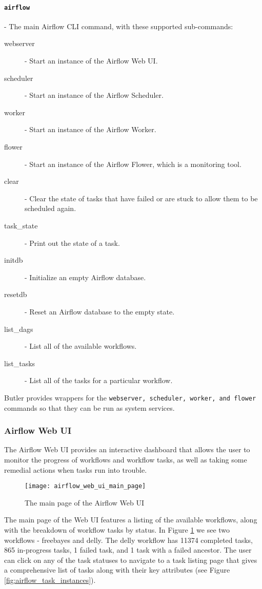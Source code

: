 \paragraph{\texttt{airflow}} - The main Airflow CLI command, with these supported sub-commands:

\begin{description}
\item [webserver] - Start an instance of the Airflow Web UI.
\item [scheduler] - Start an instance of the Airflow Scheduler.
\item [worker] - Start an instance of the Airflow Worker.
\item [flower] - Start an instance of the Airflow Flower, which is a monitoring tool.
\item [clear] - Clear the state of tasks that have failed or are stuck to allow them to be scheduled again.
\item [task\_state] - Print out the state of a task.
\item [initdb] - Initialize an empty Airflow database.
\item [resetdb] - Reset an Airflow database to the empty state.
\item [list\_dags] - List all of the available workflows.
\item [list\_tasks] - List all of the tasks for a particular workflow.
\end{description}

Butler provides wrappers for the \texttt{webserver, scheduler, worker, and flower} commands so that they can be run as system services.

\subsubsection{Airflow Web UI}

The Airflow Web UI provides an interactive dashboard that allows the user to monitor the progress of workflows and workflow tasks, as well as taking some remedial actions when tasks run into trouble.

\begin{figure}[H]
\texttt{[image: airflow\_web\_ui\_main\_page]}
\centering
\caption {The main page of the Airflow Web UI}
\label{fig:airflow_web_ui_main_page}
\end{figure}

The main page of the Web UI features a listing of the available workflows, along with the breakdown of workflow tasks by status. In Figure \ref{fig:airflow_web_ui_main_page} we see two workflows - freebayes and delly. The delly workflow has 11374 completed tasks, 865 in-progress tasks, 1 failed task, and 1 task with a failed ancestor. The user can click on any of the task statuses to navigate to a task listing page that gives a comprehensive list of tasks along with their key attributes (see Figure \ref{fig:airflow_task_instances}).

